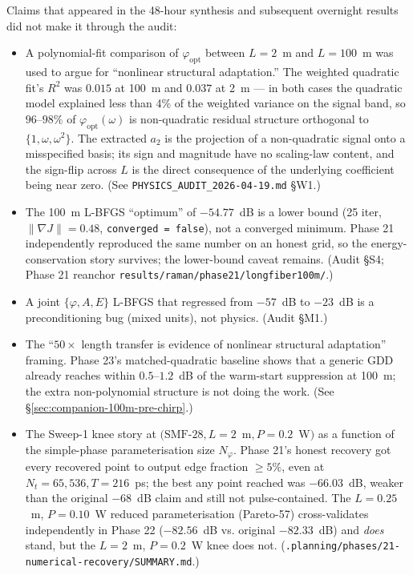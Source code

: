 \documentclass[12pt,a4paper]{article}
\begin{document}
Claims that appeared in the 48-hour synthesis and subsequent
overnight results did not make it through the audit:
\begin{itemize}
  \item A polynomial-fit comparison of $\varphi_{\text{opt}}$ between
    $L = 2$~m and $L = 100$~m was used to argue for ``nonlinear
    structural adaptation.'' The weighted quadratic fit's $R^2$ was
    $0.015$ at 100~m and $0.037$ at 2~m --- in both cases the
    quadratic model explained less than 4\% of the weighted
    variance on the signal band, so $96$--$98\%$ of
    $\varphi_{\text{opt}}(\omega)$ is non-quadratic residual
    structure orthogonal to $\{1, \omega, \omega^2\}$. The extracted
    $a_2$ is the projection of a non-quadratic signal onto a
    misspecified basis; its sign and magnitude have no scaling-law
    content, and the sign-flip across $L$ is the direct consequence
    of the underlying coefficient being near zero.
    (See \texttt{PHYSICS\_AUDIT\_2026-04-19.md} §W1.)
  \item The 100~m L-BFGS ``optimum'' of $-54.77$~dB is a lower bound
    (25 iter, $\|\nabla J\| = 0.48$, \texttt{converged = false}),
    not a converged minimum. Phase 21 independently reproduced the
    same number on an honest grid, so the energy-conservation
    story survives; the lower-bound caveat remains. (Audit §S4;
    Phase 21 reanchor \texttt{results/raman/phase21/longfiber100m/}.)
  \item A joint $\{\varphi, A, E\}$ L-BFGS that regressed from
    $-57$~dB to $-23$~dB is a preconditioning bug (mixed units), not
    physics. (Audit §M1.)
  \item The ``$50\times$ length transfer is evidence of nonlinear
    structural adaptation'' framing. Phase 23's matched-quadratic
    baseline shows that a generic GDD already reaches within
    $0.5$--$1.2$~dB of the warm-start suppression at 100~m; the
    extra non-polynomial structure is not doing the work.
    (See §\ref{sec:companion-100m-pre-chirp}.)
  \item The Sweep-1 knee story at $(\text{SMF-28}, L=2$~m$, P=0.2$~W$)$
    as a function of the simple-phase parameterisation size
    $N_\varphi$. Phase 21's honest recovery got every recovered
    point to output edge fraction $\geq 5\%$, even at
    $N_t{=}65{,}536, T{=}216$~ps; the best any point reached was
    $-66.03$~dB, weaker than the original $-68$~dB claim and still
    not pulse-contained. The $L=0.25$~m, $P=0.10$~W reduced
    parameterisation (Pareto-57) cross-validates independently in
    Phase 22 ($-82.56$~dB vs. original $-82.33$~dB) and \emph{does}
    stand, but the $L=2$~m, $P=0.2$~W knee does not.
    (\texttt{.planning/phases/21-numerical-recovery/SUMMARY.md}.)
\end{itemize}
\end{document}
